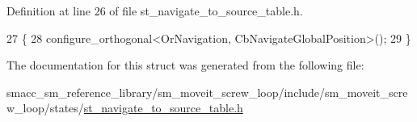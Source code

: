 Definition at line 26 of file st\+\_\+navigate\+\_\+to\+\_\+source\+\_\+table.\+h.


\begin{DoxyCode}
27         \{
28             configure\_orthogonal<OrNavigation, CbNavigateGlobalPosition>();
29         \}
\end{DoxyCode}


The documentation for this struct was generated from the following file\+:\begin{DoxyCompactItemize}
\item 
smacc\+\_\+sm\+\_\+reference\+\_\+library/sm\+\_\+moveit\+\_\+screw\+\_\+loop/include/sm\+\_\+moveit\+\_\+screw\+\_\+loop/states/\hyperlink{sm__moveit__screw__loop_2include_2sm__moveit__screw__loop_2states_2st__navigate__to__source__table_8h}{st\+\_\+navigate\+\_\+to\+\_\+source\+\_\+table.\+h}\end{DoxyCompactItemize}
